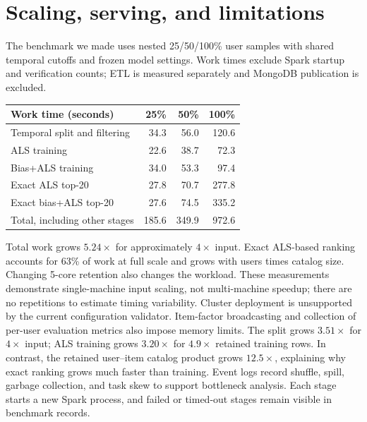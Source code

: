 \documentclass[10pt,a4paper]{article}
\begin{document}
\section*{Scaling, serving, and limitations}
The benchmark we made uses nested 25/50/100\% user samples with shared
temporal cutoffs and frozen model settings. 
Work times exclude Spark startup and verification counts;
ETL is measured separately and MongoDB publication is excluded.
\begin{center}
\begin{tabular}{lrrr}
\toprule
Work time (seconds) & 25\% & 50\% & 100\% \\
\midrule
Temporal split and filtering & 34.3 & 56.0 & 120.6 \\
ALS training                 & 22.6 & 38.7 & 72.3 \\
Bias+ALS training            & 34.0 & 53.3 & 97.4 \\
Exact ALS top-20             & 27.8 & 70.7 & 277.8 \\
Exact bias+ALS top-20        & 27.6 & 74.5 & 335.2 \\
Total, including other stages & 185.6 & 349.9 & 972.6 \\
\bottomrule
\end{tabular}
\end{center}
Total work grows $5.24\times$ for approximately $4\times$ input. Exact ALS-based
ranking accounts for 63\% of work at full scale and grows with users times catalog
size. Changing 5-core retention also changes the workload. These measurements
demonstrate single-machine input scaling, not multi-machine speedup; there are no
repetitions to estimate timing variability. Cluster deployment is unsupported by
the current configuration validator. Item-factor broadcasting and collection of
per-user evaluation metrics also impose memory limits.
The split grows $3.51\times$ for $4\times$ input; ALS training grows
$3.20\times$ for $4.9\times$ retained training rows. In contrast, the retained
user--item catalog product grows $12.5\times$, explaining why exact ranking grows
much faster than training. Event logs record shuffle, spill, garbage collection,
and task skew to support bottleneck analysis. Each stage starts a new Spark
process, and failed or timed-out stages remain visible in benchmark records.
\end{document}
